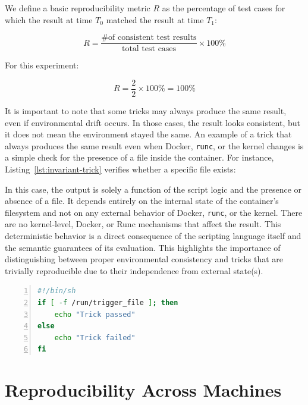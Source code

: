 \begin{doublespace}
We define a basic reproducibility metric \( R \) as the percentage of test cases for which the result at time \( T_0 \) matched the result at time \( T_1 \):

\[
R = \frac{\text{\# of consistent test results}}{\text{total test cases}} \times 100\%
\]

For this experiment:

\[
R = \frac{2}{2} \times 100\% = 100\%
\]

It is important to note that some tricks may always produce the same result, even if environmental drift occurs. In those cases, the result looks consistent, but it does not mean the environment stayed the same. An example of a trick that always produces the same result even when Docker, \texttt{runc}, or the kernel changes is a simple check for the presence of a file inside the container. For instance, Listing~\ref{lst:invariant-trick} verifies whether a specific file exists:

In this case, the output is solely a function of the script logic and the presence or absence of a file. It depends entirely on the internal state of the container's filesystem and not on any external behavior of Docker, \texttt{runc}, or the kernel. There are no kernel-level, Docker, or Runc mechanisms that affect the result. This deterministic behavior is a direct consequence of the scripting language itself and the semantic guarantees of its evaluation. This highlights the importance of distinguishing between proper environmental consistency and tricks that are trivially reproducible due to their independence from external state(s).

\begin{lstlisting}[language=bash, caption={Trick that is invariant to environment changes}, label={lst:invariant-trick}, numbers=left, numberstyle=\tiny, stepnumber=1, frame=single, backgroundcolor=\color{gray!10}, basicstyle=\ttfamily\footnotesize,  showspaces=false, showstringspaces=false]
#!/bin/sh
if [ -f /run/trigger_file ]; then
    echo "Trick passed"
else
    echo "Trick failed"
fi
\end{lstlisting}



















\section{Reproducibility Across Machines}


\end{doublespace}
